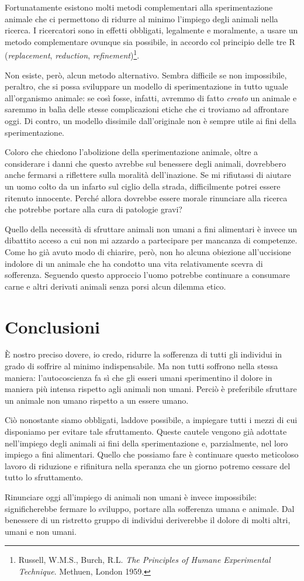 \documentclass[a4paper,11pt,oneside,article]{memoir}
\begin{document}
Fortunatamente esistono molti metodi complementari alla sperimentazione animale
che ci permettono di ridurre al minimo l'impiego degli animali nella ricerca. I
ricercatori sono in effetti obbligati, legalmente e moralmente, a usare un
metodo complementare ovunque sia possibile, in accordo col principio delle tre R
(\emph{replacement}, \emph{reduction}, \emph{refinement})\footnote{Russell,
W.M.S., Burch, R.L. \emph{The Principles of Humane Experimental Technique}.
Methuen, London 1959.}.

Non esiste, però, alcun metodo alternativo. Sembra difficile se non impossibile,
peraltro, che si possa sviluppare un modello di sperimentazione in tutto uguale
all'organismo animale: se così fosse, infatti, avremmo di fatto \emph{creato} un
animale e saremmo in balìa delle stesse complicazioni etiche che ci troviamo ad
affrontare oggi. Di contro, un modello dissimile dall'originale non è sempre
utile ai fini della sperimentazione.

Coloro che chiedono l'abolizione della sperimentazione animale, oltre a
considerare i danni che questo avrebbe sul benessere degli animali, dovrebbero
anche fermarsi a riflettere sulla moralità dell'inazione. Se mi rifiutassi di
aiutare un uomo colto da un infarto sul ciglio della strada, difficilmente
potrei essere ritenuto innocente. Perché allora dovrebbe essere morale
rinunciare alla ricerca che potrebbe portare alla cura di patologie gravi?

Quello della necessità di sfruttare animali non umani a fini alimentari è invece
un dibattito acceso a cui non mi azzardo a partecipare per mancanza di
competenze. Come ho già avuto modo di chiarire, però, non ho alcuna obiezione
all'uccisione indolore di un animale che ha condotto una vita relativamente
scevra di sofferenza. Seguendo questo approccio l'uomo potrebbe continuare a
consumare carne e altri derivati animali senza porsi alcun dilemma etico.

\chapter{Conclusioni}

È nostro preciso dovere, io credo, ridurre la sofferenza di tutti gli individui
in grado di soffrire al minimo indispensabile. Ma non tutti soffrono nella
stessa maniera: l'autocoscienza fa sì che gli esseri umani sperimentino il
dolore in maniera più intensa rispetto agli animali non umani. Perciò è
preferibile sfruttare un animale non umano rispetto a un essere umano.

Ciò nonostante siamo obbligati, laddove possibile, a impiegare tutti i mezzi di
cui disponiamo per evitare tale sfruttamento. Queste cautele vengono già
adottate nell'impiego degli animali ai fini della sperimentazione e,
parzialmente, nel loro impiego a fini alimentari. Quello che possiamo fare è
continuare questo meticoloso lavoro di riduzione e rifinitura nella speranza che
un giorno potremo cessare del tutto lo sfruttamento.

Rinunciare oggi all'impiego di animali non umani è invece impossibile:
significherebbe fermare lo sviluppo, portare alla sofferenza umana e animale.
Dal benessere di un ristretto gruppo di individui deriverebbe il dolore di molti
altri, umani e non umani.
\end{document}
